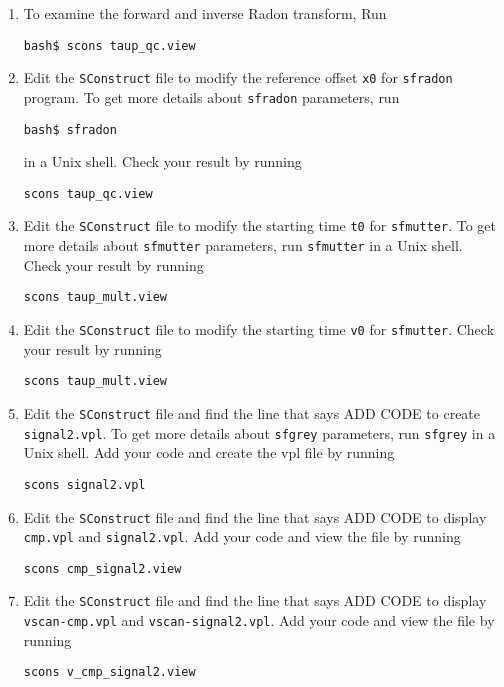 \begin{enumerate}
\item To examine the forward and inverse Radon transform, Run
\begin{verbatim}
bash$ scons taup_qc.view
\end{verbatim}


\item Edit the \texttt{SConstruct} file to modify the reference offset \texttt{x0} for \texttt{sfradon} program. To get more details about \texttt{sfradon} parameters, run 
\begin{verbatim}
bash$ sfradon
\end{verbatim}
in a Unix shell. Check your result by running
\begin{verbatim}
scons taup_qc.view
\end{verbatim}

\item Edit the \texttt{SConstruct} file to modify the starting time \texttt{t0} for \texttt{sfmutter}. To get more details about \texttt{sfmutter} parameters, run \texttt{sfmutter} in a Unix shell. Check your result by running
\begin{verbatim}
scons taup_mult.view
\end{verbatim}

\item Edit the \texttt{SConstruct} file to modify the starting time \texttt{v0} for \texttt{sfmutter}. Check your result by running
\begin{verbatim}
scons taup_mult.view
\end{verbatim}

\item Edit the \texttt{SConstruct} file and find the line that says ADD CODE to create \texttt{signal2.vpl}. To get more details about \texttt{sfgrey} parameters, run \texttt{sfgrey} in a Unix shell. Add your code and create the vpl file by running
\begin{verbatim}
scons signal2.vpl
\end{verbatim}

\item Edit the \texttt{SConstruct} file and find the line that says ADD CODE to display \texttt{cmp.vpl} and \texttt{signal2.vpl}. Add your code and view the file by running
\begin{verbatim}
scons cmp_signal2.view
\end{verbatim}

\item Edit the \texttt{SConstruct} file and find the line that says ADD CODE to display \texttt{vscan-cmp.vpl} and \texttt{vscan-signal2.vpl}.  Add your code and view the file by running
\begin{verbatim}
scons v_cmp_signal2.view
\end{verbatim}


\end{enumerate}

